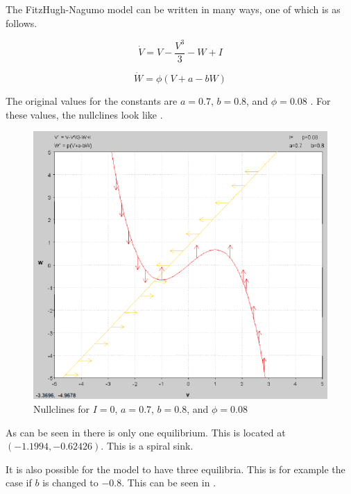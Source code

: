 \documentclass[../Orator]{subfiles}
\begin{document}
The FitzHugh-Nagumo model can be written in many ways, one of which is as follows.

\begin{equation}
    \dot{V}=V-\frac{V^{3}}{3}-W+I
\end{equation}

\begin{equation}
    \dot{W}=\phi (V+a-bW)
\end{equation}

The original values for the constants are \(a=0.7\), \(b=0.8\), and \(\phi=0.08\) \cite{}. For these values, the nullclines look like . 

\begin{figure}[h]
    \centering
    \includegraphics[width=400pt]{Pictures/Alex/Nullclines - original.PNG}
    \caption{Nullclines for \(I=0\), \(a=0.7\), \(b=0.8\), and \(\phi=0.08\)}
    \label{fig:nullclines-original}
\end{figure}

As can be seen in  there is only one equilibrium. This is located at \((-1.1994, -0.62426)\). This is a spiral sink. 

It is also possible for the model to have three equilibria. This is for example the case if \(b\) is changed to \(-0.8\). This can be seen in .
\end{document}
